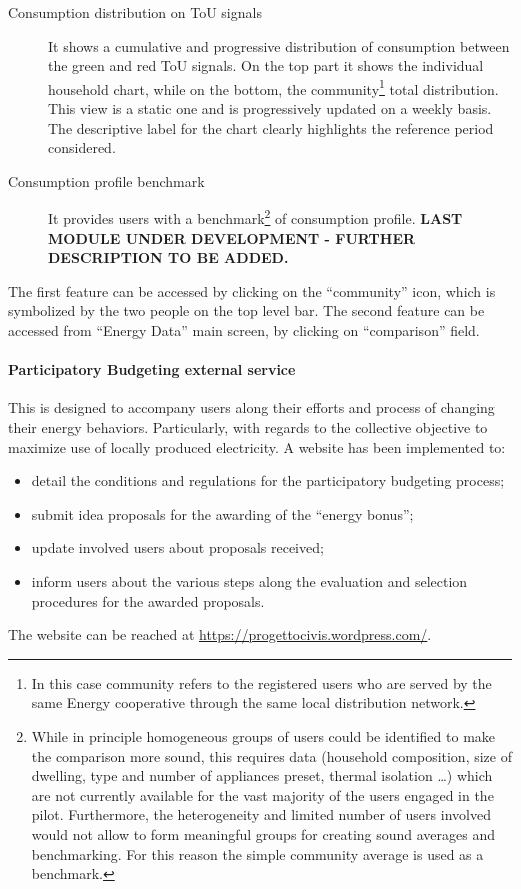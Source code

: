 \begin{description}
 \item[Consumption distribution on ToU signals] It shows a cumulative and progressive distribution of consumption between the green and red ToU signals.
 On the top part it shows the individual household chart, while on the bottom, the community\footnote{In this case community refers to the registered users who 
 are served by the same Energy cooperative through the same local distribution network.} total distribution. This view is a static one and is progressively updated on a weekly basis. The descriptive label for the chart clearly highlights the reference period considered.
 \item[Consumption profile benchmark] It provides users with a benchmark\footnote{While in principle homogeneous groups of users could be identified to make the comparison more sound, this requires data (household composition, size of dwelling, type and number of appliances preset, thermal isolation \ldots) which are not currently available for the vast majority of the users engaged in the pilot.
 Furthermore, the heterogeneity and limited number of users involved would not allow to form meaningful groups for creating sound averages and benchmarking. For this reason the simple community average is used as a benchmark.} of consumption profile. \textbf{LAST MODULE UNDER DEVELOPMENT - FURTHER DESCRIPTION TO BE ADDED.}
\end{description}
The first feature can be accessed by clicking on the ``community'' icon, which is symbolized by the two people on the top level bar.
The second feature can be accessed from ``Energy Data'' main screen, by clicking on ``comparison'' field.

\paragraph{Participatory Budgeting external service} 

This is designed to accompany users along their efforts and process of changing their energy behaviors.
Particularly, with regards to the collective objective to maximize use of locally produced electricity. A website has been implemented to:
\begin{itemize}
 \item detail the conditions and regulations for the participatory budgeting process;
 \item submit idea proposals for the awarding of the ``energy bonus'';
 \item update involved users about proposals received;
 \item inform users about the various steps along the evaluation and selection procedures for the awarded proposals. 
\end{itemize}
The website can be reached at \url{https://progettocivis.wordpress.com/}.

%